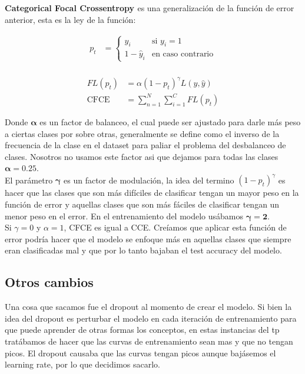\documentclass[12pt, titlepage, a4paper]{article}
\begin{document}
\textbf{Categorical Focal Crossentropy \cite{CategoricalFocal} \cite{Categorical}} es una generalización de la función de error anterior, esta es la ley de la función:

\[
\begin{aligned}
    p_t &= 
    \begin{cases}
        \hat{y}_i & \text{si } y_i = 1 \\
        1 - \hat{y}_i & \text{en caso contrario}
    \end{cases} \\[4ex]
\end{aligned}
\]

\[
\begin{aligned}
    FL(p_t) &= \alpha (1 - p_t)^\gamma L(y, \hat{y}) \\[2ex]
    \mathrm{CFCE} &= \sum_{n=1}^{N} \sum_{i=1}^{C} FL(p_t)
\end{aligned}
\]

Donde $\boldsymbol{\alpha}$ es un factor de balanceo, el cual puede ser ajustado para darle más peso a ciertas clases por sobre otras, generalmente se define como el inverso de la frecuencia de la clase en el dataset para paliar el problema del desbalanceo de clases. Nosotros no usamos este factor asi que dejamos para todas las clases $\boldsymbol{\alpha=0.25}$.\\

El parámetro $\boldsymbol{\gamma}$ es un factor de modulación, la idea del termino $(1-p_t)^\gamma$ es hacer que las clases que son más difíciles de clasificar tengan un mayor peso en la función de error y aquellas clases que son más fáciles de clasificar tengan un menor peso en el error. En el entrenamiento del modelo usábamos $\boldsymbol{\gamma=2}$.\\

Si $\gamma=0$ y $\alpha=1$, CFCE es igual a CCE. Creíamos que aplicar esta función de error podría hacer que el modelo se enfoque más en aquellas clases que siempre eran clasificadas mal y que por lo tanto bajaban el test accuracy del modelo.

\subsection{Otros cambios}

Una cosa que sacamos fue el dropout al momento de crear el modelo. Si bien la idea del dropout es perturbar el modelo en cada iteración de entrenamiento para que puede aprender de otras formas los conceptos, en estas instancias del tp tratábamos de hacer que las curvas de entrenamiento sean mas  y que no tengan picos. El dropout causaba que las curvas tengan picos aunque bajásemos el learning rate, por lo que decidimos sacarlo.\\
\end{document}

